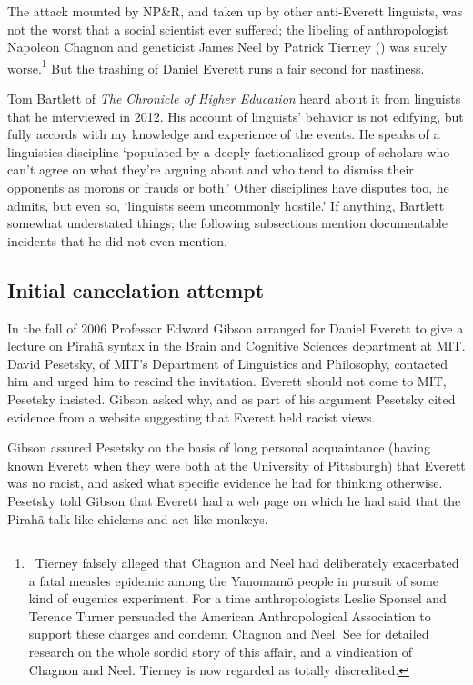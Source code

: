 \documentclass[output=paper,colorlinks,citecolor=brown
]{langscibook}
\begin{document}
The attack mounted by NP\&R, and taken up by other anti-Everett
linguists, was not the worst that a social scientist ever suffered;
the libeling of anthropologist Napoleon Chagnon and geneticist James
Neel by Patrick Tierney (\citeyear{Tierney00}) was surely worse.\footnote{\,
   Tierney falsely alleged that Chagnon and Neel had deliberately
   exacerbated a fatal measles epidemic among the Yanomam{\"o} people
   in pursuit of some kind of eugenics experiment. For a time
   anthropologists Leslie Sponsel and Terence Turner persuaded the
   American Anthropological Association to support these charges and
   condemn Chagnon and Neel. See \citealt{Dreger11} for detailed
   research on the whole sordid story of this affair, and a vindication
   of Chagnon and Neel. Tierney is now regarded as totally discredited.}
But the trashing of Daniel Everett runs a fair second for nastiness.

Tom Bartlett of \textit{The Chronicle of Higher Education} heard
about it from linguists that he interviewed in 2012. His account of
linguists' behavior \citep{Bartlett12} is not edifying, but fully
accords with my knowledge and experience of the events. He speaks
of a linguistics discipline `populated by a deeply factionalized
group of scholars who can't agree on what they're arguing about
and who tend to dismiss their opponents as morons or frauds or both.'
Other disciplines have disputes too, he admits, but even so,
`linguists seem uncommonly hostile.' If anything, Bartlett somewhat
understated things; the following subsections mention documentable
incidents that he did not even mention.

\subsection{Initial cancelation attempt}\label{river}

In the fall of 2006 Professor Edward Gibson arranged for Daniel
Everett to give a lecture on Pirah{\~a} syntax in the Brain and
Cognitive Sciences department at MIT. David Pesetsky, of MIT's
Department of Linguistics and Philosophy, contacted him and
urged him to rescind the invitation. Everett should not come to
MIT, Pesetsky insisted. Gibson asked why, and as part of his argument
Pesetsky cited evidence from a website suggesting that Everett held
racist views.

Gibson assured Pesetsky on the basis of long personal acquaintance
(having known Everett when they were both at the University of
Pittsburgh) that Everett was no racist, and asked what specific
evidence he had for thinking otherwise. Pesetsky told Gibson that
Everett had a web page on which he had said that the Pirah{\~a}
talk like chickens and act like monkeys.
\end{document}
